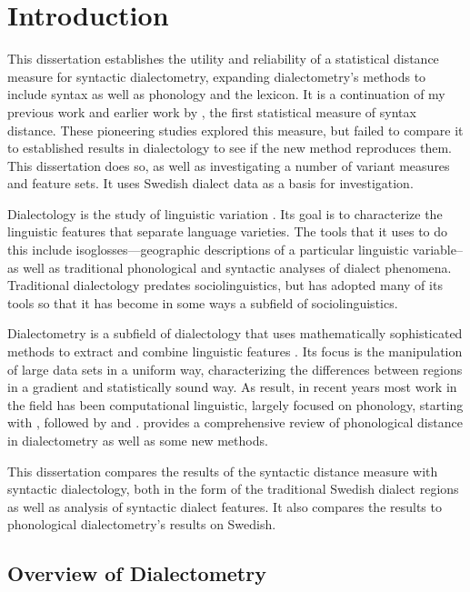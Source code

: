 \chapter{Introduction}

This dissertation establishes the utility and reliability of a
statistical distance measure for syntactic dialectometry, expanding
dialectometry's methods to include syntax as well as phonology and the
lexicon. It is a continuation of my previous work \cite{sanders07,sanders08b} and earlier work by , the first
statistical measure of syntax distance. These pioneering studies
explored this measure, but failed to compare it to established results
in dialectology to see if the new method reproduces them. This
dissertation does so, as well as investigating a number of variant
measures and feature sets. It uses Swedish dialect data as a basis for
investigation.

Dialectology is the study of linguistic variation \cite{chambers98}.
Its goal is to characterize the linguistic features that separate
language varieties. The tools that it uses to do this include
isoglosses---geographic descriptions of a particular linguistic
variable--as well as traditional phonological and syntactic analyses
of dialect phenomena. Traditional dialectology predates
sociolinguistics, but has adopted many of its tools so that it has
become in some ways a subfield of sociolinguistics.

Dialectometry is a subfield of dialectology that uses mathematically
sophisticated methods to extract and combine linguistic features
\cite{seguy73}. Its focus is the manipulation of large data sets in a
uniform way, characterizing the differences between regions in a
gradient and statistically sound way. As result, in recent years most
work in the field has been computational linguistic, largely focused
on phonology, starting with , followed by
 and . 
provides a comprehensive review of phonological distance in
dialectometry as well as some new methods.

This dissertation compares the results of the syntactic distance
measure with syntactic dialectology, both in the form of the traditional
Swedish dialect regions as well as analysis of syntactic dialect
features. It also compares the results to phonological dialectometry's
results on Swedish.

\section{Overview of Dialectometry}

